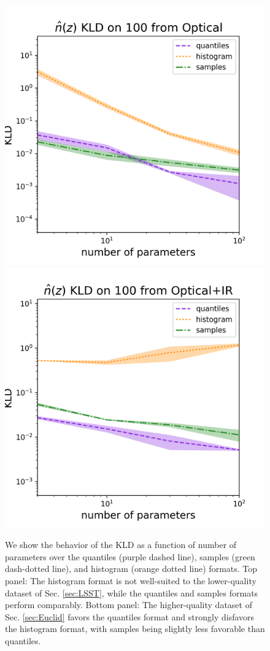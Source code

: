 \documentclass[\docopts]{\docclass}
\begin{document}
\begin{figure}
  \includegraphics[width=0.9\columnwidth]{figures/lsst_kld.png}\\
  \includegraphics[width=0.9\columnwidth]{figures/euclid_kld.png}
  \caption{We show the behavior of the KLD as a function of number of 
parameters over the quantiles (purple dashed line), samples (green dash-dotted 
line), and histogram (orange dotted line) formats.  Top panel: The histogram 
format is not well-suited to the lower-quality dataset of Sec. \ref{sec:LSST}, 
while the quantiles and samples formats perform comparably.  Bottom panel: The 
higher-quality dataset of Sec. \ref{sec:Euclid} favors the quantiles format and 
strongly disfavors the histogram format, with samples being slightly less 
favorable than quantiles.
  \label{fig:kld}}
\end{figure}
\end{document}
